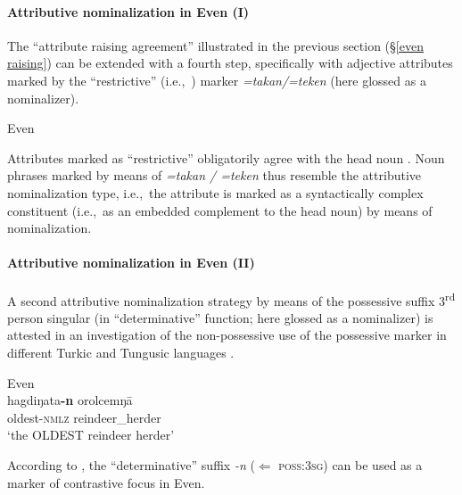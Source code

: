 \paragraph*{Attributive nominalization in Even (I)}
The “attribute raising agreement” illustrated in the previous section (\S\ref{even raising}) can be extended with a fourth step, specifically with adjective attributes marked by the “restrictive” (i.e.,~) marker \textit{=takan/=teken} (here glossed as a nominalizer).%
\begin{exe}
\ex 
\rm{Even \citep[32]{malchukov1995}}
\begin{xlist}
\end{xlist}
\end{exe}
Attributes marked as “restrictive” obligatorily agree with the head noun \cite[32]{malchukov1995}. Noun phrases marked by means of \textit{=takan / =teken} thus resemble the attributive nominalization type, i.e.,~the attribute is marked as a syntactically complex constituent (i.e.,~as an embedded complement to the head noun) by means of nominalization.

\paragraph*{Attributive nominalization in Even (II)}
A second attributive nominalization strategy by means of the possessive suffix 3\textsuperscript{rd} person singular (in “determinative” function; here glossed as a nominalizer) is attested in an investigation of the non-possessive use of the possessive marker in different Turkic and Tungusic languages \citep{benzing1993b}.
\begin{exe}
\ex 
\rm{Even \citep[17–18 Footnote 58]{benzing1993b}}\\
\gll	hagdiŋata\textbf{-n} orolcemŋā\\
	oldest-\textsc{nmlz} reindeer\_herder\\
\glt	‘the OLDEST reindeer herder’
\end{exe}
According to \cite[17–18 Footnote 58]{benzing1993b}, the “determinative” suffix \textit{-n} ($\Leftarrow$ \textsc{poss:3sg}) can be used as a marker of contrastive focus in Even.

